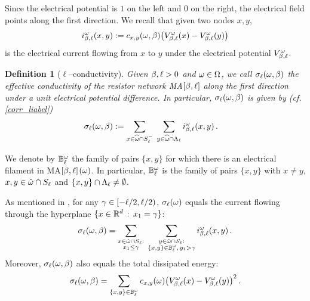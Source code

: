 \documentclass[12pt,a4paper,reqno]{amsart}
\newtheorem{Definition}[Theorem]{Definition}
\newcommand{\bbB}{{\ensuremath{\mathbb B}} }
\newcommand{\bbR}{{\ensuremath{\mathbb R}} }
\newcommand{\mammaL}{MA$[\b,\ell]$}
\newcommand{\V}{V_{\b,\ell}^\o}
\let\O=\Omega \let\P=\Pi   \let\Ps=\Psi \let\Si=\Sigma \let\X=\Xi
\newcommand{\be}{\begin{equation}}
\newcommand{\en}{\end{equation}}
\begin{document}
Since  the electrical potential is $1$ on the left and $0$ on the right, the electrical field points along the first direction. 
We recall that given two nodes $x,y$,
\be\label{corr_liabel} i^\o _{\b, \ell}(x,y):=c_{x,y}(\o,\b) \bigl(\V (x)- \V (y) \bigr)
\en  is the electrical current flowing from $x$ to $y$ under the electrical potential $\V$.
\begin{Definition}[$\ell$--conductivity]  \label{def_ell_cond} Given  $\beta,\ell>0$ and  $\o \in \O$,
we call $\sigma_\ell(\omega,\beta)$ the \emph{effective conductivity} of the resistor network  \mammaL{}  along the first direction under a unit  electrical potential difference.  In particular,  $\sigma_\ell (\omega,\beta)$ is given by (cf. \eqref{corr_liabel})
 \be\label{ide1}
\begin{split}
 \s_\ell(\o,\b)& :=  \sum _{x\in \widehat \o \cap S_\ell^-} \; \sum_{y \in  \widehat \o \cap \L_\ell}i^\o _{\b, \ell}(x,y) \,.
\end{split}
 \en
\end{Definition} 



We denote by 
$\bbB_\ell^\o$  the family of  pairs $\{x,y\}$  for which there is an electrical filament  in \mammaL$(\omega)$.  In particular, $\bbB_\ell^\o$ is  the family of  pairs $\{x,y\}$ 
with $x\not =y$, $x,y\in \hat {\omega} \cap S_{\ell}$ and $\{x,y\}\cap \Lambda_\ell \not =\emptyset$.



As mentioned in \cite{Fhom2}, for any $\gamma \in [-\ell/2, \ell/2)$, 
 $\sigma_\ell(\omega)$ equals the current flowing through the hyperplane $\{x\in \bbR^d\,:\, x_1=\g\}$:
\begin{equation}\label{eq_ailo0}
\s_\ell(\o,\b )=\sum _{\substack{x\in \hat \o \cap S_\ell:\\
 x_1\leq \g }} \; \sum_{\substack{ y \in  \hat \o \cap S_\ell:\\
 \{x,y\} \in \bbB^\o_\ell, \, y_1>\g
 }} i^\o _{\b, \ell}(x,y) \,.
 \end{equation}
 Moreover, $\sigma_\ell(\omega,\beta )$   also equals  the total dissipated energy:
\begin{equation}\label{eq_ailo}
\s_\ell(\o,\b)= \sum_{ \{x,y\} \in \bbB^\o_\ell } c_{x,y}(\o) \bigl( V^\o _{\b,\ell} (x) - V^\o _{\b,\ell} (y) \bigr)^2\,.
\end{equation}
\end{document}
